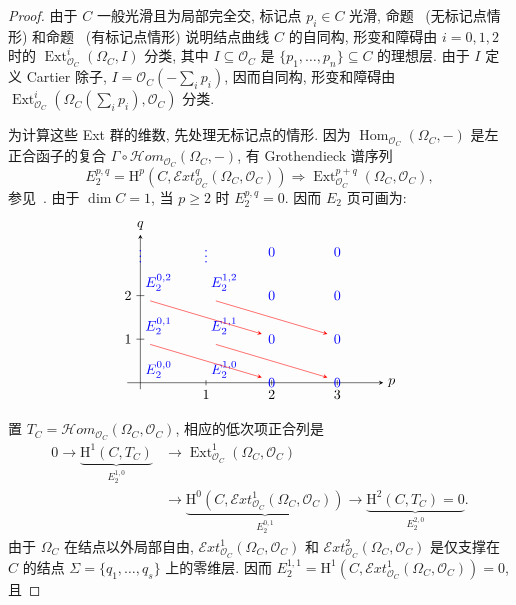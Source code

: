 \begin{proof}
由于 $C$ 一般光滑且为局部完全交, 标记点 $p_i\in C$ 光滑, 命题~ (无标记点情形) 和命题~ (有标记点情形) 说明结点曲线 $C$ 的自同构, 形变和障碍由 $i=0,\allowbreak 1,\allowbreak 2$ 时的 $\operatorname{Ext}^i_{\mathcal O_C}(\Omega_C,\allowbreak I)$ 分类, 其中 $I\subseteq\mathcal O_C$ 是 $\{p_1,\allowbreak \ldots,\allowbreak p_n\}\subseteq C$ 的理想层. 由于 $I$ 定义 Cartier 除子, $I=\mathcal O_C(-\sum_i p_i)$, 因而自同构, 形变和障碍由 $\operatorname{Ext}^i_{\mathcal O_C}(\Omega_C(\sum_i p_i),\allowbreak \mathcal O_C)$ 分类.

为计算这些 Ext 群的维数, 先处理无标记点的情形. 因为 $\operatorname{Hom}_{\mathcal O_C}(\Omega_C,\allowbreak -)$ 是左正合函子的复合 $\Gamma\circ\mathcal H om_{\mathcal O_C}(\Omega_C,\allowbreak -)$, 有 Grothendieck 谱序列
\[
E_2^{p,q}=\mathrm H^p(C,\mathcal E xt^q_{\mathcal O_C}(\Omega_C,\mathcal O_C))\Rightarrow\operatorname{Ext}^{p+q}_{\mathcal O_C}(\Omega_C,\mathcal O_C),
\]
参见~\cite[定理 5.8.3]{Wei94}. 由于 $\dim C=1$, 当 $p\geq2$ 时 $E_2^{p,\allowbreak q}=0$. 因而 $E_2$ 页可画为:
\[
\begin{tikzpicture}[x=1.65cm,y=1.1cm,>=stealth]
\draw[->](-.2,0)--(3.7,0) node[right]{$p$};
\draw[->](0,-.15)--(0,3.4) node[above]{$q$};
\foreach \x in {1,2,3}{\draw(\x,.06)--(\x,-.06) node[below]{$\x$};}
\foreach \y in {1,2}{\draw(.06,\y)--(-.06,\y) node[left]{$\y$};}
\foreach \x in {0,1}{\foreach \y in {0,1,2}{\node[anchor=south west,text=blue] at (\x,\y){$E_2^{\x,\y}$};}}
\foreach \x in {2,3}{\foreach \y in {0,1,2,3}{\node[text=blue] at (\x,\y){$0$};}}
\foreach \x in {0,1}{\node[text=blue] at (\x,3){$\vdots$};}
\foreach \x in {0,1}{\foreach \y in {1,2}{\draw[->,red](\x+.15,\y-.12)--(\x+1.85,\y-.88);}}
\end{tikzpicture}
\]
置 $T_C=\mathcal H om_{\mathcal O_C}(\Omega_C,\allowbreak \mathcal O_C)$, 相应的低次项正合列是
\begin{equation}\label{src:6.3.27}
\begin{aligned}
0\to\underbrace{\mathrm H^1(C,T_C)}_{E_2^{1,0}}&\to\operatorname{Ext}^1_{\mathcal O_C}(\Omega_C,\mathcal O_C)\\
&\to\underbrace{\mathrm H^0(C,\mathcal E xt^1_{\mathcal O_C}(\Omega_C,\mathcal O_C))}_{E_2^{0,1}}\to\underbrace{\mathrm H^2(C,T_C)=0}_{E_2^{2,0}}.
\end{aligned}
\end{equation}
由于 $\Omega_C$ 在结点以外局部自由, $\mathcal E xt^1_{\mathcal O_C}(\Omega_C,\allowbreak \mathcal O_C)$ 和 $\mathcal E xt^2_{\mathcal O_C}(\Omega_C,\allowbreak \mathcal O_C)$ 是仅支撑在 $C$ 的结点 $\Sigma=\{q_1,\allowbreak \ldots,\allowbreak q_s\}$ 上的零维层. 因而 $E_2^{1,\allowbreak 1}=\mathrm H^1(C,\allowbreak \mathcal E xt^1_{\mathcal O_C}(\Omega_C,\allowbreak \mathcal O_C))=0$, 且

\end{proof}
